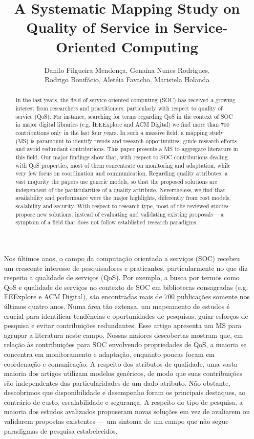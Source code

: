 \documentclass[12pt]{article}
\title{A Systematic Mapping Study on Quality of Service in Service-Oriented Computing}
\author{Danilo Filgueira Mendon\c{c}a\inst{1}, Gena\'{i}na Nunes Rodrigues\inst{1}, \\ Rodrigo Bonif\'{a}cio\inst{1}, Alet\'{e}ia Favacho\inst{1}, Maristela Holanda\inst{1} }
\begin{document}
 

\maketitle

\begin{abstract}
  In the last years, the field of service oriented computing (SOC) has received a growing interest from researchers and practitioners, particularly with respect to quality of service (QoS). For instance, searching for terms regarding QoS in the context of SOC in major digital libraries (e.g. IEEExplore and ACM Digital) we find more than 700 contributions only in the last four years. In such a massive field, a mapping study (MS) is paramount to identify trends and research opportunities, guide research efforts and avoid redundant contributions. This paper presents a MS to aggregate literature in this field. Our major findings show that, with respect to SOC contributions dealing with QoS properties, most of them concentrate on monitoring and adaptation, while very few focus on coordination and communication. Regarding quality attributes, a vast majority the papers use generic models, so that the proposed solutions are independent of the particularities of a quality attribute. Nevertheless, we find that availability and performance were the major highlights, differently from cost models, scalability and security. With respect to research type, most of the reviewed studies propose new solutions, instead of evaluating and validating existing proposals--- a symptom of a field that does not follow established research paradigms.
\end{abstract}

\begin{resumo}
  Nos últimos anos, o campo da computação orientada a serviços (SOC) recebeu um crescente interesse de pesquisadores e praticantes, particularmente no que diz respeito a qualidade de serviços (QoS). Por exemplo, a busca por termos como QoS e qualidade de serviços no contexto de SOC em bibliotecas consagradas (e.g. EEExplore e ACM Digital), são encontradas mais de 700 publicações somente nos últimos quatro anos. Numa área tão extensa, um mapeamento de estudos é crucial para identificar tendências e oportunidades de pesquisas, guiar esforços de pesquisa e evitar contribuições redundantes. Esse artigo apresenta um MS para agrupar a literatura neste campo. Nossas maiores descobertas mostram que, em relação às contribuições para SOC envolvendo propriedades de QoS, a maioria se concentra em monitoramento e adaptação, enquanto poucas focam em coordenação e comunicação. A respeito dos atributos de qualidade, uma vasta maioria dos artigos utilizam modelos genéricos, de modo que suas contribuições são independentes das particularidades de um dado atributo. Não obstante, descobrimos que disponibilidade e desempenho foram os principais destaques, ao contrário de custo, escalabilidade e segurança. A respeito do tipo de pesquisa, a maioria dos estudos avalizados propuseram novas soluções em vez de avaliarem ou validarem propostas existentes --- um sintoma de um campo que não segue paradigmas de pesquisa estabelecidos.
  
\end{resumo}
\end{document}

